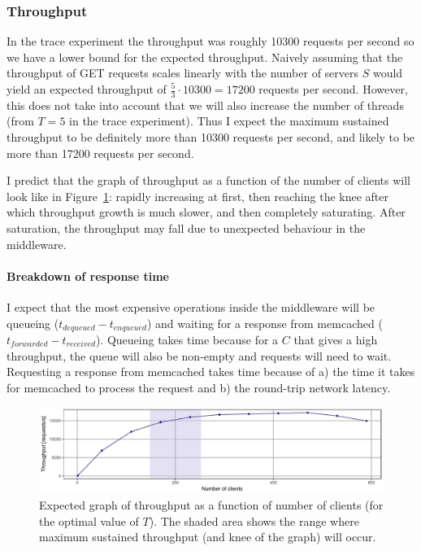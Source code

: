 \documentclass[11pt]{article}
\begin{document}
\subsubsection{Throughput}
In the trace experiment the throughput was roughly 10300 requests per second so we have a lower bound for the expected throughput. Naively assuming that the throughput of GET requests scales linearly with the number of servers $S$ would yield an expected throughput of $\frac{5}{3} \cdot 10300 = 17200$ requests per second. However, this does not take into account that we will also increase the number of threads (from $T=5$ in the trace experiment). Thus I expect the maximum sustained throughput to be definitely more than 10300 requests per second, and likely to be more than 17200 requests per second.

I predict that the graph of throughput as a function of the number of clients will look like in Figure~\ref{fig:exp1:hyp:throughput}: rapidly increasing at first, then reaching the knee after which throughput growth is much slower, and then completely saturating. After saturation, the throughput may fall due to unexpected behaviour in the middleware.

\paragraph{Breakdown of response time}
I expect that the most expensive operations inside the middleware will be queueing ($t_{dequeued}-t_{enqueued}$) and waiting for a response from memcached ($t_{forwarded}-t_{received}$). Queueing takes time because for a $C$ that gives a high throughput, the queue will also be non-empty and requests will need to wait. Requesting a response from memcached takes time because of a) the time it takes for memcached to process the request and b) the round-trip network latency.

\begin{figure}[h]
\centering
\includegraphics[width=\textwidth]{figures/hypothesis_throughput.pdf}
\caption{Expected graph of throughput as a function of number of clients (for the optimal value of $T$). The shaded area shows the range where maximum sustained throughput (and knee of the graph) will occur.}
\label{fig:exp1:hyp:throughput}
\end{figure}
\end{document}
